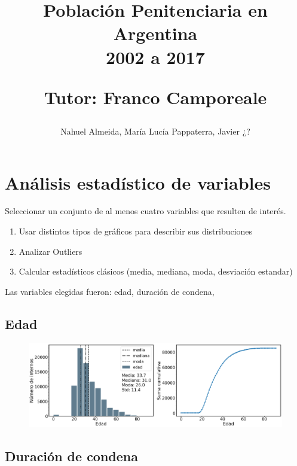 \documentclass[10pt]{article}
\begin{document}
	
\title{Población Penitenciaria en Argentina\\ 2002 a 2017 \\
	\begin{small}
		Tutor: Franco Camporeale
	\end{small}}
\author{\small{Nahuel Almeida, María Lucía Pappaterra, Javier ¿?}}

\maketitle

\section{Análisis estadístico de variables}

Seleccionar un conjunto de al menos cuatro variables que resulten de interés.

\begin{enumerate}
	\item Usar distintos tipos de gráficos para describir sus distribuciones
	\item Analizar Outliers
	\item Calcular estadísticos clásicos (media, mediana, moda, desviación estandar)
\end{enumerate}

Las variables elegidas fueron: edad, duración de condena, 

\subsection{Edad}

\begin{figure}[H]
	\centering
	\includegraphics[scale=0.3]{graficos/edad.png}
	\caption{}
\end{figure}

\subsection{Duración de condena}
\end{document}
